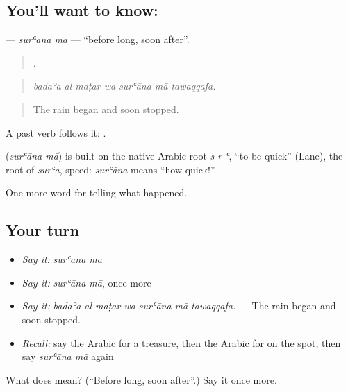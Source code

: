 \subsection*{You'll want to know:  }
\textbf{ } — \emph{surʿāna mā} — \textquotedblleft{}before long, soon after\textquotedblright{}.

\begin{quote}
    .
\end{quote}

\begin{quote}
\emph{badaʾa al-maṭar wa-surʿāna mā tawaqqafa.}
\end{quote}

\begin{quote}
The rain began and soon stopped.
\end{quote}

A past verb follows it:   .

\begin{cousinweb}
\textbf{ } (\emph{surʿāna mā}) is built on the native Arabic root \emph{s-r-ʿ}, \textquotedblleft{}to be quick\textquotedblright{} (Lane), the root of \emph{surʿa}, speed: \emph{surʿāna} means \textquotedblleft{}how quick!\textquotedblright{}.
\end{cousinweb}

\begin{grammarlens}[title={What you've built}]
One more word for telling what happened.
\end{grammarlens}

\subsection*{Your turn}
\begin{itemize}
\raggedright
  \item \emph{Say it:} \emph{surʿāna mā}
  \item \emph{Say it:} \emph{surʿāna mā}, once more
  \item \emph{Say it:} \emph{badaʾa al-maṭar wa-surʿāna mā tawaqqafa.} — The rain began and soon stopped.
  \item \emph{Recall:} say the Arabic for a treasure, then the Arabic for on the spot, then say \emph{surʿāna mā} again
\end{itemize}

\begin{tcolorbox}[breakable,colback=teal!4,colframe=teal!35!black,title={Before you move on}]
What does   mean? (\textquotedblleft{}Before long, soon after\textquotedblright{}.) Say it once more.
\end{tcolorbox}
